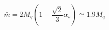 \begin{equation}                              
\bar{m} = 2 M_{q} ( 1 -\frac{\sqrt{2}}{3} \alpha_{s}) \simeq 1.9 M_{q}                               
\end{equation} 
